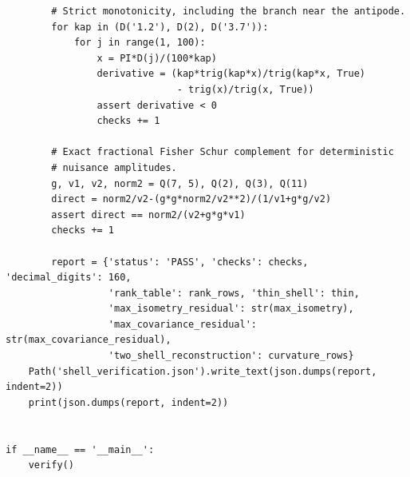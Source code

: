 \documentclass[aps,prd,reprint,amsmath,amssymb,nofootinbib,
longbibliography]{revtex4-2}
\begin{document}
\begin{lstlisting}
        # Strict monotonicity, including the branch near the antipode.
        for kap in (D('1.2'), D(2), D('3.7')):
            for j in range(1, 100):
                x = PI*D(j)/(100*kap)
                derivative = (kap*trig(kap*x)/trig(kap*x, True)
                              - trig(x)/trig(x, True))
                assert derivative < 0
                checks += 1

        # Exact fractional Fisher Schur complement for deterministic
        # nuisance amplitudes.
        g, v1, v2, norm2 = Q(7, 5), Q(2), Q(3), Q(11)
        direct = norm2/v2-(g*g*norm2/v2**2)/(1/v1+g*g/v2)
        assert direct == norm2/(v2+g*g*v1)
        checks += 1

        report = {'status': 'PASS', 'checks': checks, 'decimal_digits': 160,
                  'rank_table': rank_rows, 'thin_shell': thin,
                  'max_isometry_residual': str(max_isometry),
                  'max_covariance_residual': str(max_covariance_residual),
                  'two_shell_reconstruction': curvature_rows}
    Path('shell_verification.json').write_text(json.dumps(report, indent=2))
    print(json.dumps(report, indent=2))


if __name__ == '__main__':
    verify()
\end{lstlisting}
\end{document}
